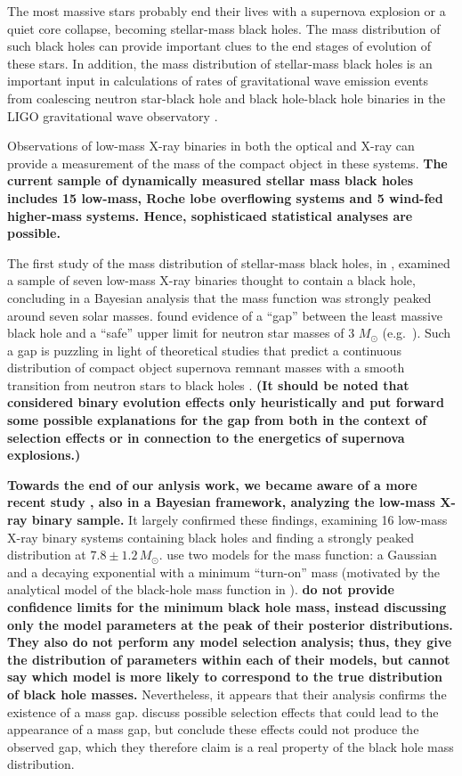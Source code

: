 \documentclass[preprint]{aastex}
\newcommand{\Msun}{M_\odot}
\newcommand{\changed}[1]{{\bf #1 }}
\begin{document}
The most massive stars probably end their lives with a supernova
explosion or a quiet core collapse, becoming stellar-mass black holes.
The mass distribution of such black holes can provide important clues
to the end stages of evolution of these stars.  In addition, the mass
distribution of stellar-mass black holes is an important input in
calculations of rates of gravitational wave emission events from
coalescing neutron star-black hole and black hole-black hole binaries
in the LIGO gravitational wave observatory \citep{Abadie2010}.

Observations of low-mass X-ray binaries in both the optical and X-ray
can provide a measurement of the mass of the compact object in these
systems.  \changed{The current sample of dynamically measured stellar
  mass black holes includes 15 low-mass, Roche lobe overflowing
  systems and 5 wind-fed higher-mass systems.  Hence, sophisticaed
  statistical analyses are possible.}

The first study of the mass distribution of stellar-mass black holes,
in \citet{Bailyn1998}, examined a sample of seven low-mass X-ray
binaries thought to contain a black hole, concluding in a Bayesian
analysis that the mass function was strongly peaked around seven solar
masses.  \citet{Bailyn1998} found evidence of a ``gap'' between the
least massive black hole and a ``safe'' upper limit for neutron star
masses of 3 $\Msun$ (e.g.\ \citet{Kalogera1996}).  Such a gap is
puzzling in light of theoretical studies that predict a continuous
distribution of compact object supernova remnant masses with a smooth
transition from neutron stars to black holes \citep{Fryer2001}.
\changed{(It should be noted that \citet{Fryer2001} considered binary
  evolution effects only heuristically and put forward some possible
  explanations for the gap from \citet{Bailyn1998} both in the context
  of selection effects or in connection to the energetics of supernova
  explosions.)}

\changed{Towards the end of our anlysis work, we became aware of a
  more recent study \citep{Ozel2010}, also in a Bayesian framework,
  analyzing the low-mass X-ray binary sample.}  It largely confirmed
these findings, examining 16 low-mass X-ray binary systems containing
black holes and finding a strongly peaked distribution at $7.8 \pm 1.2
\, \Msun$.  \citet{Ozel2010} use two models for the mass function: a
Gaussian and a decaying exponential with a minimum ``turn-on'' mass
(motivated by the analytical model of the black-hole mass function in
\citet{Fryer2001}).  \changed{\citet{Ozel2010} do not provide
  confidence limits for the minimum black hole mass, instead
  discussing only the model parameters at the peak of their posterior
  distributions.  They also do not perform any model selection
  analysis; thus, they give the distribution of parameters within each
  of their models, but cannot say which model is more likely to
  correspond to the true distribution of black hole masses.}
Nevertheless, it appears that their analysis confirms the existence of
a mass gap.  \citet{Ozel2010} discuss possible selection effects that
could lead to the appearance of a mass gap, but conclude these effects
could not produce the observed gap, which they therefore claim is a
real property of the black hole mass distribution.
\end{document}
